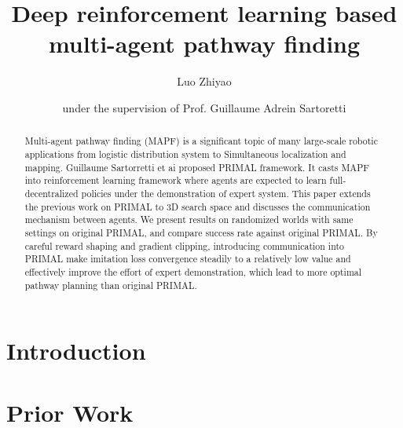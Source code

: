 \documentclass[sigconf,authordraft, nonacm=true]{acmart}
\begin{document}
\title{Deep reinforcement learning based multi-agent pathway finding}

\author{Luo Zhiyao}
\author{under the supervision of Prof. Guillaume Adrein Sartoretti}


\begin{abstract}
  Multi-agent pathway finding (MAPF) is a significant topic of many large-scale robotic applications from logistic distribution system to Simultaneous localization and mapping. Guillaume Sartorretti et ai proposed PRIMAL framework. It casts MAPF into reinforcement learning framework where agents are expected to learn full-decentralized policies under the demonstration of expert system. This paper extends the previous work on PRIMAL to 3D search space and discusses the communication mechanism between agents. We present results on randomized worlds with same settings on original PRIMAL, and compare success rate against original PRIMAL. By careful reward shaping and gradient clipping, introducing communication into PRIMAL make imitation loss convergence steadily to a relatively low value and effectively improve the effort of expert demonstration, which lead to more optimal pathway planning than original PRIMAL. 
\end{abstract}



\maketitle

\section{Introduction}


\section{Prior Work}
\end{document}
